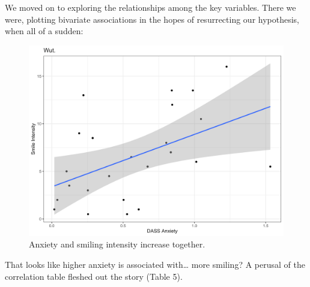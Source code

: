 \documentclass[authordate, empirical,issue]{jote-new-article}
\begin{document}
We moved on to exploring the relationships among the key variables. There we were, plotting bivariate associations in the hopes of resurrecting our hypothesis, when all of a sudden:







\begin{figure}[h!]
  \begin{fullwidth}
    \includegraphics[width=\linewidth]{media/image4.png}

    \caption{Anxiety and smiling intensity increase together.}

  \end{fullwidth}
  \label{fig:rId11}


\end{figure}






That looks like higher anxiety is associated with… more smiling? A perusal of the correlation table fleshed out the story (Table 5).
\end{document}
